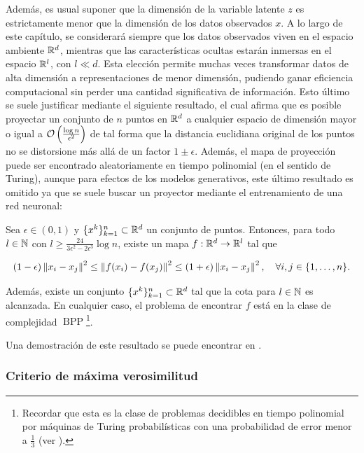 Además, es usual suponer que la dimensión de la variable latente $z$ es estrictamente menor que la dimensión de los datos observados $x$. A lo largo de este capítulo, se considerará siempre que los datos observados viven en el espacio ambiente $\mathbb{R}^d$, mientras que las características ocultas estarán inmersas en el espacio $\mathbb{R}^l$, con $l\ll d$. Esta elección permite muchas veces transformar datos de alta dimensión a representaciones de menor dimensión, pudiendo ganar eficiencia computacional sin perder una cantidad significativa de información. Esto último se suele justificar mediante el siguiente resultado, el cual afirma que es posible proyectar un conjunto de $n$ puntos en $\mathbb{R}^d$ a cualquier espacio de dimensión mayor o igual a $\mathcal{O}\left(\frac{\log n}{\epsilon^2}\right)$ de tal forma que la distancia euclidiana original de los puntos no se distorsione más allá de un factor $1\pm\epsilon$. Además, el mapa de proyección puede ser encontrado aleatoriamente en tiempo polinomial (en el sentido de Turing), aunque para efectos de los modelos generativos, este último resultado es omitido ya que se suele buscar un proyector mediante el entrenamiento de una red neuronal:

\begin{teo}
    Sea $\epsilon\in (0,1)$ y $\{x^k\}_{k=1}^n\subset\mathbb{R}^d$ un conjunto de puntos. Entonces, para todo $l\in\mathbb{N}$ con $l\geq\frac{24}{3\epsilon^2 - 2\epsilon^3} \log n$, existe un mapa $f:\mathbb{R}^d\to\mathbb{R}^l$ tal que

    \begin{equation*}
        (1-\epsilon)\left\lVert x_i-x_j \right\rVert^2 \leq \left\lVert f(x_i)-f(x_j) \right\rVert^2 \leq (1+\epsilon)\left\lVert x_i-x_j \right\rVert^2, \quad\forall i,j\in\{1,\ldots,n\}.
    \end{equation*}

    Además, existe un conjunto $\{x^k\}_{k=1}^n\subset\mathbb{R}^d$ tal que la cota para $l\in\mathbb{N}$ es alcanzada. En cualquier caso, el problema de encontrar $f$ está en la clase de complejidad $\operatorname{BPP}$\footnote{Recordar que esta es la clase de problemas decidibles en tiempo polinomial por máquinas de Turing probabilísticas con una probabilidad de error menor a $\frac{1}{3}$ (ver \cite{arora2009computational}).}.
\end{teo}

Una demostración de este resultado se puede encontrar en \cite{dasgupta2003elementary}.

\subsubsection{Criterio de máxima verosimilitud}

